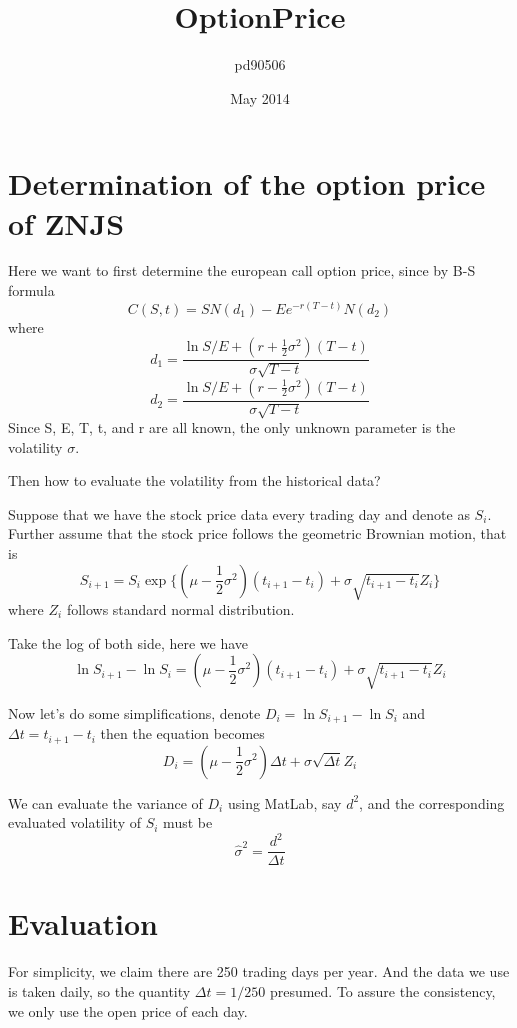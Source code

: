 \documentclass{article}
\title{OptionPrice}
\author{pd90506 }
\date{May 2014}
\begin{document}
\maketitle

\section{Determination of the option price of ZNJS}

Here we want to first determine the european call option price, since by B-S formula
\begin{equation}
C(S,t) = SN(d_1)-Ee^{-r(T-t)}N(d_2)
\end{equation}
where
\[
    d_1 = \frac{\ln{S/E}+(r+\frac{1}{2} \sigma^2)(T-t)}{\sigma \sqrt{T-t}}
\]
\[
    d_2 = \frac{\ln{S/E}+(r-\frac{1}{2} \sigma^2)(T-t)}{\sigma \sqrt{T-t}}
\]
Since S, E, T, t, and r are all known, the only unknown parameter is the volatility $\sigma$.

Then how to evaluate the volatility from the historical data? 

Suppose that we have the stock price data every trading day and denote as $S_i$.
Further assume that the stock price follows the geometric Brownian motion, that is
\begin{equation}
S_{i+1} = S_i\exp\{(\mu -\frac12 \sigma^2)(t_{i+1}-t_i) + \sigma \sqrt{t_{i+1}-t_i}Z_i\}
\end{equation}
where $Z_i$ follows standard normal distribution.

Take the log of both side, here we have
\begin{equation}
\ln{S_{i+1}}-\ln{S_i} = (\mu -\frac12 \sigma^2)(t_{i+1}-t_i) + \sigma \sqrt{t_{i+1}-t_i}Z_i
\end{equation}

Now let's do some simplifications, denote $D_i = \ln{S_{i+1}}-\ln{S_i}$ and $\Delta t =t_{i+1}-t_i $ then the equation becomes
\begin{equation}
D_i = (\mu -\frac12 \sigma^2)\Delta t + \sigma \sqrt{\Delta t}Z_i
\end{equation}

We can evaluate the variance of $D_i$ using MatLab, say $d^2$, and the corresponding evaluated volatility of $S_i$ must be
\begin{equation}
\hat{\sigma}^2 = \frac{d^2}{\Delta t}
\end{equation}

\section{Evaluation}
For simplicity, we claim there are 250 trading days per year. And the data we use is taken daily, so the quantity $\Delta t = 1/250$ presumed. To assure the consistency, we only use the open price of each day.
\end{document}
